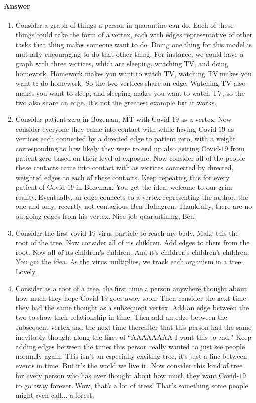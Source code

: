 \documentclass{article}
\begin{document}
\paragraph{Answer}


\begin{enumerate}
	\item Consider a graph of things a person in quarantine can do. Each of these things could take the form of a vertex, each
		with edges representative of other tasks that thing makes someone want to do. Doing one thing for this model is
		mutually encouraging to do that other thing. For instance, we could have a graph with three vertices, which are sleeping,
		watching TV, and doing homework. Homework makes you want to watch TV, watching TV makes you want to do homework. So the two
		vertices share an edge. Watching TV also makes you want to sleep, and sleeping makes you want to watch TV, so the two also
		share an edge. It's not the greatest example but it works.
	\item Consider patient zero in Bozeman, MT with Covid-19 as a vertex. Now consider everyone they came into contact
		with while having Covid-$19$ as vertices each connected by a directed edge to patient zero, with a weight corresponding
		to how likely they were to end up also getting Covid-$19$ from patient zero based on their level of exposure. 
		Now consider all of the
		people these contacts came into contact with as vertices connected by directed, weighted edges to each of these contacts. 
		Keep repeating
		this for every patient of Covid-$19$ in Bozeman. You get the idea, welcome to our grim reality. 
		Eventually, an edge connects to a vertex representing
		the author, the one and only, recently not contagious Ben Holmgren. Thankfully, there are no outgoing edges from his vertex.
		Nice job quarantining, Ben!
	\item Consider the first covid-19 virus particle to reach my body. Make this the root of the tree. Now consider all of its children.
		Add edges to them from the root. Now all of its children's children. And it's children's children's children. You get the
		idea. As the virus multiplies, we track each organism in a tree. Lovely.
	\item Consider as a root of a tree, the first time a person anywhere thought about how much they hope Covid-$19$ goes away soon.
		Then consider the next time they had the same thought as a subsequent vertex. Add an edge between the two to show their
		relationship in time. Then add an edge between the subsequent vertex and the next time thereafter that this person had the
		same inevitably thought along the lines of ``AAAAAAAA I want this to end." Keep adding edges between the times this person
		really wanted to just see people normally again. This isn't an especially exciting tree, it's just a line between events in
		time. But it's the world we live in. Now consider this kind of tree for every person who has ever thought about how much
		they want Covid-$19$ to go away forever. Wow, that's a lot of trees! That's something some people might even call... a forest.
		
\end{enumerate}
\end{document}
